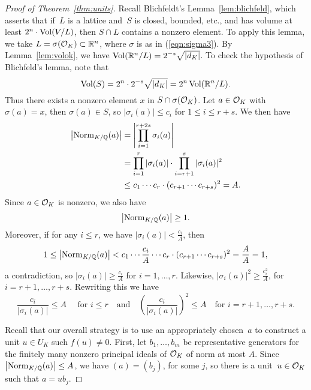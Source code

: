 \begin{proof}[Proof of Theorem~\ref{thm:units}]
	Recall Blichfeldt's Lemma~\ref{lem:blichfeld}, which asserts
	that if~$L$ is a lattice and~$S$ is closed, bounded, etc., and has volume
	at least $2^n\cdot \operatorname{Vol}(V/L)$, then $S\cap L$ contains a nonzero element.
	To apply this lemma, we take $L=\sigma(\mathcal{O}_K)\subset \mathbb{R}^n$, where $\sigma$
	is as in (\ref{eqn:sigma3}). By Lemma~\ref{lem:volok}, we have
	$\operatorname{Vol}(\mathbb{R}^n/L) = 2^{-s}\sqrt{|d_K|}$. To check the hypothesis of
	Blichfeld's lemma, note that
	$$
		\operatorname{Vol}(S) = 2^n \cdot 2^{-s} \sqrt{|d_K|} = 2^n \operatorname{Vol}(\mathbb{R}^n/L).
	$$
	Thus there exists a nonzero element $x$ in $S\cap \sigma(\mathcal{O}_K)$.
	Let $a\in \mathcal{O}_K$ with $\sigma(a)=x$, then $\sigma(a)\in S$, so
	$|\sigma_i(a)|\leq c_i$ for $1\leq i\leq r+s$. We then have
	\begin{align*}
		\left|\operatorname{Norm}_{K/\mathbb{Q}}(a)\right|
		&= \left|\prod_{i=1}^{r+2s} \sigma_i(a)\right| \\
		&= \prod_{i=1}^r |\sigma_i(a)|\cdot \prod_{i=r+1}^s|\sigma_i(a)|^2 \\
		&\leq c_1\cdots c_r\cdot (c_{r+1}\cdots c_{r+s})^2 = A.
	\end{align*}
	Since $a\in \mathcal{O}_K$ is nonzero, we also have
	$$
		\left|\operatorname{Norm}_{K/\mathbb{Q}}(a)\right|\geq 1.
	$$
	Moreover, if for any $i\leq r$, we have $|\sigma_i(a)|< \frac{c_i}{A}$, then
	$$
		1
		\leq \left|\operatorname{Norm}_{K/\mathbb{Q}}(a)\right|
		< c_1\cdots \frac{c_i}{A}\cdots c_r \cdot (c_{r+1}\cdots c_{r+s})^2
		= \frac{A}{A} = 1,
	$$
	a contradiction, so $|\sigma_i(a)|\geq \frac{c_i}{A}$ for $i=1,\ldots, r$.
	Likewise, $|\sigma_i(a)|^2 \geq \frac{c_i^2}{A}$, for $i=r+1,\ldots, r+s$.
	Rewriting this we have
	\begin{equation}\label{eqn:cisigbound}
		\frac{c_i}{|\sigma_i(a)|}\leq A\quad\text{ for }i\leq r
		\quad\text{and}\quad
		\left(\frac{c_i}{|\sigma_i(a)|}\right)^2
		\leq A\quad\text{for } i=r+1,\ldots, r+s.
	\end{equation}
	
	Recall that our overall strategy is to use an appropriately chosen~$a$
	to construct a unit $u\in U_K$ such $f(u)\neq 0$.  First, let
	$b_1,\ldots, b_m$ be representative generators for the finitely many
	nonzero principal ideals of $\mathcal{O}_K$ of norm at most $A$.  Since
	$\left|\operatorname{Norm}_{K/\mathbb{Q}}(a)\right|\leq A$, we have $(a)=(b_j)$, for some $j$, so there
	is a unit~$u\in \mathcal{O}_K$ such that $a=u b_j$.
	

\end{proof}
